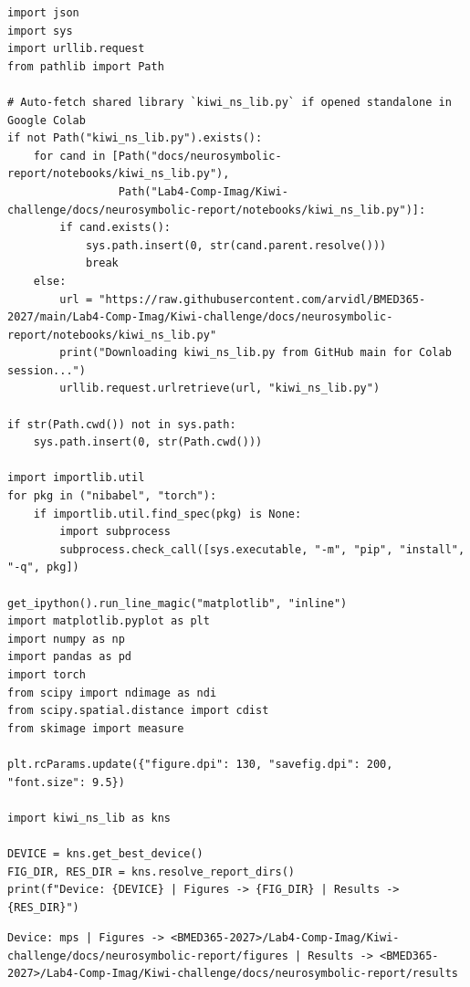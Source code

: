 \documentclass[10pt,a4paper]{article}
\renewcommand{\_}{\origunderscore\allowbreak}
\begin{document}
\begin{codebox}
\begin{lstlisting}[style=pybmed]
import json
import sys
import urllib.request
from pathlib import Path

# Auto-fetch shared library `kiwi_ns_lib.py` if opened standalone in Google Colab
if not Path("kiwi_ns_lib.py").exists():
    for cand in [Path("docs/neurosymbolic-report/notebooks/kiwi_ns_lib.py"),
                 Path("Lab4-Comp-Imag/Kiwi-challenge/docs/neurosymbolic-report/notebooks/kiwi_ns_lib.py")]:
        if cand.exists():
            sys.path.insert(0, str(cand.parent.resolve()))
            break
    else:
        url = "https://raw.githubusercontent.com/arvidl/BMED365-2027/main/Lab4-Comp-Imag/Kiwi-challenge/docs/neurosymbolic-report/notebooks/kiwi_ns_lib.py"
        print("Downloading kiwi_ns_lib.py from GitHub main for Colab session...")
        urllib.request.urlretrieve(url, "kiwi_ns_lib.py")

if str(Path.cwd()) not in sys.path:
    sys.path.insert(0, str(Path.cwd()))

import importlib.util
for pkg in ("nibabel", "torch"):
    if importlib.util.find_spec(pkg) is None:
        import subprocess
        subprocess.check_call([sys.executable, "-m", "pip", "install", "-q", pkg])

get_ipython().run_line_magic("matplotlib", "inline")
import matplotlib.pyplot as plt
import numpy as np
import pandas as pd
import torch
from scipy import ndimage as ndi
from scipy.spatial.distance import cdist
from skimage import measure

plt.rcParams.update({"figure.dpi": 130, "savefig.dpi": 200, "font.size": 9.5})

import kiwi_ns_lib as kns

DEVICE = kns.get_best_device()
FIG_DIR, RES_DIR = kns.resolve_report_dirs()
print(f"Device: {DEVICE} | Figures -> {FIG_DIR} | Results -> {RES_DIR}")
\end{lstlisting}
\end{codebox}
\begin{outbox}
\begin{lstlisting}[style=outbmed]
Device: mps | Figures -> <BMED365-2027>/Lab4-Comp-Imag/Kiwi-challenge/docs/neurosymbolic-report/figures | Results -> <BMED365-2027>/Lab4-Comp-Imag/Kiwi-challenge/docs/neurosymbolic-report/results
\end{lstlisting}
\end{outbox}
\end{document}
